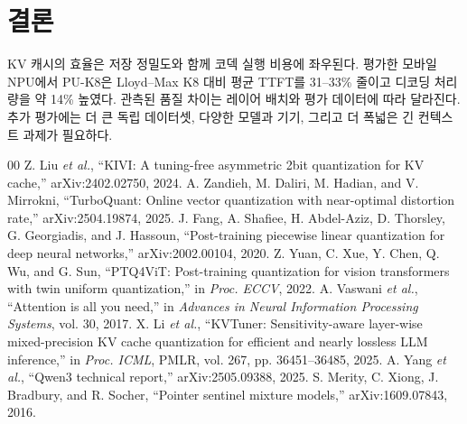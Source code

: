 \documentclass[conference,a4paper,10pt]{IEEEtran}
\begin{document}
\raggedend
\newpage
\section{결론}
KV 캐시의 효율은 저장 정밀도와 함께 코덱 실행 비용에 좌우된다. 평가한 모바일 NPU에서 PU-K8은 Lloyd--Max K8 대비 평균 TTFT를 31--33\% 줄이고 디코딩 처리량을 약 14\% 높였다. 관측된 품질 차이는 레이어 배치와 평가 데이터에 따라 달라진다. 추가 평가에는 더 큰 독립 데이터셋, 다양한 모델과 기기, 그리고 더 폭넓은 긴 컨텍스트 과제가 필요하다.

\begin{thebibliography}{00}
 Z. Liu \emph{et al.}, ``KIVI: A tuning-free asymmetric 2bit quantization for KV cache,'' arXiv:2402.02750, 2024.
 A. Zandieh, M. Daliri, M. Hadian, and V. Mirrokni, ``TurboQuant: Online vector quantization with near-optimal distortion rate,'' arXiv:2504.19874, 2025.
 J. Fang, A. Shafiee, H. Abdel-Aziz, D. Thorsley, G. Georgiadis, and J. Hassoun, ``Post-training piecewise linear quantization for deep neural networks,'' arXiv:2002.00104, 2020.
 Z. Yuan, C. Xue, Y. Chen, Q. Wu, and G. Sun, ``PTQ4ViT: Post-training quantization for vision transformers with twin uniform quantization,'' in \emph{Proc. ECCV}, 2022.
 A. Vaswani \emph{et al.}, ``Attention is all you need,'' in \emph{Advances in Neural Information Processing Systems}, vol. 30, 2017.
 X. Li \emph{et al.}, ``KVTuner: Sensitivity-aware layer-wise mixed-precision KV cache quantization for efficient and nearly lossless LLM inference,'' in \emph{Proc. ICML}, PMLR, vol. 267, pp. 36451--36485, 2025.
 A. Yang \emph{et al.}, ``Qwen3 technical report,'' arXiv:2505.09388, 2025.
 S. Merity, C. Xiong, J. Bradbury, and R. Socher, ``Pointer sentinel mixture models,'' arXiv:1609.07843, 2016.
\end{thebibliography}
\end{document}
